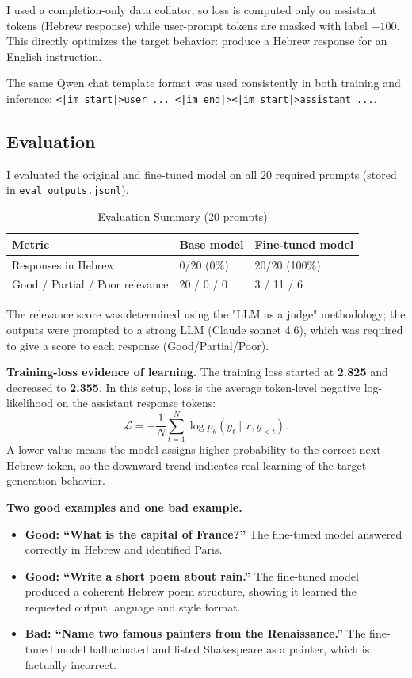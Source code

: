 \documentclass[11pt, a4paper]{article}
\begin{document}
I used a completion-only data collator, so loss is computed only on assistant
tokens (Hebrew response) while user-prompt tokens are masked with label $-100$.
This directly optimizes the target behavior: produce a Hebrew response for an
English instruction.

The same Qwen chat template format was used consistently in both training and
inference:
\texttt{<|im\_start|>user ... <|im\_end|><|im\_start|>assistant ...}.

\subsection{Evaluation}

I evaluated the original and fine-tuned model on all 20 required prompts
(stored in \texttt{eval\_outputs.jsonl}).

\begin{table}[H]
\centering
\caption{Evaluation Summary (20 prompts)}
\begin{tabular}{L{5cm}C{4cm}C{4cm}}
\toprule
Metric & Base model & Fine-tuned model \\
\midrule
Responses in Hebrew & 0/20 (0\%) & 20/20 (100\%) \\
Good / Partial / Poor relevance & 20 / 0 / 0 & 3 / 11 / 6 \\
\bottomrule
\end{tabular}
\end{table}

The relevance score was determined using the "LLM as a judge" methodology; the outputs were prompted to a strong LLM (Claude sonnet 4.6), which was required to give a score to each response (Good/Partial/Poor).

\textbf{Training-loss evidence of learning.}
The training loss started at \textbf{2.825} and decreased to
\textbf{2.355}.
In this setup, loss is the average token-level negative log-likelihood on the
assistant response tokens:
\[
\mathcal{L} = -\frac{1}{N}\sum_{t=1}^{N}\log p_{\theta}(y_t\mid x, y_{<t}).
\]
A lower value means the model assigns higher probability to the correct next
Hebrew token, so the downward trend indicates real learning of the target
generation behavior.

\textbf{Two good examples and one bad example.}
\begin{itemize}[leftmargin=*]
  \item \textbf{Good: ``What is the capital of France?''}
  The fine-tuned model answered correctly in Hebrew and identified Paris.
  \item \textbf{Good: ``Write a short poem about rain.''}
  The fine-tuned model produced a coherent Hebrew poem structure, showing it
  learned the requested output language and style format.
  \item \textbf{Bad: ``Name two famous painters from the Renaissance.''}
  The fine-tuned model hallucinated and listed Shakespeare as a painter,
  which is factually incorrect.
\end{itemize}
\end{document}
